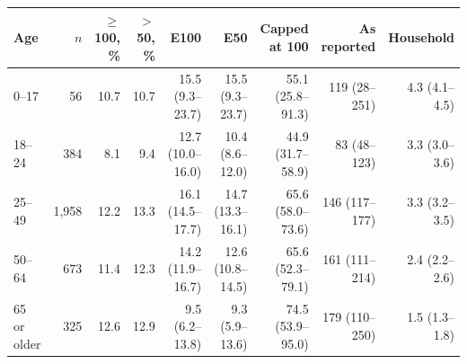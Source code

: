 \begin{tabular}{lrrrrrrrr}
\toprule
Age & $n$ & $\ge$100, \% & $>$50, \% & E100 & E50 & Capped at 100 & As reported & Household \\
\midrule
0--17 & 56 & 10.7 & 10.7 & 15.5 (9.3--23.7) & 15.5 (9.3--23.7) & 55.1 (25.8--91.3) & 119 (28--251) & 4.3 (4.1--4.5) \\
18--24 & 384 & 8.1 & 9.4 & 12.7 (10.0--16.0) & 10.4 (8.6--12.0) & 44.9 (31.7--58.9) & 83 (48--123) & 3.3 (3.0--3.6) \\
25--49 & 1,958 & 12.2 & 13.3 & 16.1 (14.5--17.7) & 14.7 (13.3--16.1) & 65.6 (58.0--73.6) & 146 (117--177) & 3.3 (3.2--3.5) \\
50--64 & 673 & 11.4 & 12.3 & 14.2 (11.9--16.7) & 12.6 (10.8--14.5) & 65.6 (52.3--79.1) & 161 (111--214) & 2.4 (2.2--2.6) \\
65 or older & 325 & 12.6 & 12.9 & 9.5 (6.2--13.8) & 9.3 (5.9--13.6) & 74.5 (53.9--95.0) & 179 (110--250) & 1.5 (1.3--1.8) \\
\bottomrule
\end{tabular}
